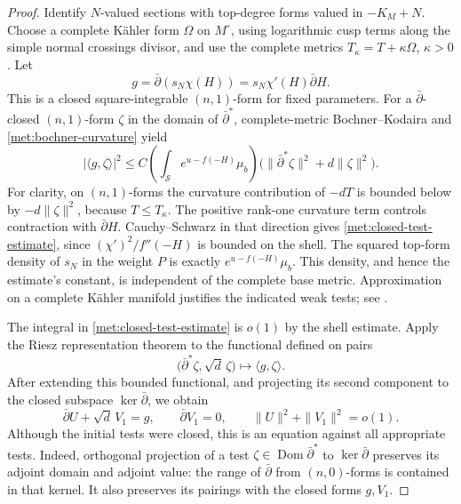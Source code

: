 \documentclass[11pt,letterpaper]{article}
\theoremstyle{definition}
\theoremstyle{remark}
\begin{document}
\begin{proof}
Identify \(N\)-valued sections with top-degree forms valued in
\(-K_M+N\).  Choose a complete K\"ahler form \(\Omega\) on
\(M^\circ\), using logarithmic cusp terms along the simple normal
crossings divisor, and use the complete metrics
\(T_\kappa=T+\kappa\Omega\), \(\kappa>0\).  Let
\[
 g=\bar\partial(s_N\chi(H))
   =s_N\chi'(H)\bar\partial H.
\]
This is a closed square-integrable \((n,1)\)-form for fixed parameters.
For a \(\bar\partial\)-closed \((n,1)\)-form \(\zeta\) in the domain
of \(\bar\partial^*\), complete-metric Bochner--Kodaira and
\eqref{met:bochner-curvature} yield
\begin{equation}
 \label{met:closed-test-estimate}
 |\langle g,\zeta\rangle|^2
 \leq C\left(\int_{\mathcal S}e^{u-f(-H)}\mu_b\right)
       \bigl(\|\bar\partial^*\zeta\|^2+d\|\zeta\|^2\bigr).
\end{equation}
For clarity, on \((n,1)\)-forms the curvature contribution of
\(-dT\) is bounded below by \(-d\|\zeta\|^2\), because
\(T\leq T_\kappa\).  The positive rank-one curvature term controls
contraction with \(\bar\partial H\).  Cauchy--Schwarz in that
direction gives \eqref{met:closed-test-estimate}, since
\((\chi')^2/f''(-H)\) is bounded on the shell.  The squared top-form
density of \(s_N\) in the weight \(P\) is exactly
\(e^{u-f(-H)}\mu_b\).  This density, and hence the estimate's
constant, is independent of the complete base metric.  Approximation
on a complete K\"ahler manifold justifies the indicated weak tests;
see \cite[Sections 4--5]{DemaillyL2}.

The integral in \eqref{met:closed-test-estimate} is \(o(1)\) by the
shell estimate.  Apply the Riesz representation theorem to the
functional defined on pairs
\[
 \bigl(\bar\partial^*\zeta,\sqrt d\,\zeta\bigr)
 \longmapsto\langle g,\zeta\rangle.
\]
After extending this bounded functional, and projecting its second
component to the closed subspace \(\ker\bar\partial\), we obtain
\begin{equation}
 \label{met:residual-riesz}
 \bar\partial U+\sqrt d\,V_1=g,
 \qquad \bar\partial V_1=0,
 \qquad \|U\|^2+\|V_1\|^2=o(1).
\end{equation}
Although the initial tests were closed, this is an equation against
all appropriate tests.  Indeed, orthogonal projection of a test
\(\zeta\in\operatorname{Dom}\bar\partial^*\) to
\(\ker\bar\partial\) preserves its adjoint domain and adjoint value:
the range of \(\bar\partial\) from \((n,0)\)-forms is contained in
that kernel.  It also preserves its pairings with the closed forms
\(g,V_1\).


\end{proof}
\end{document}

